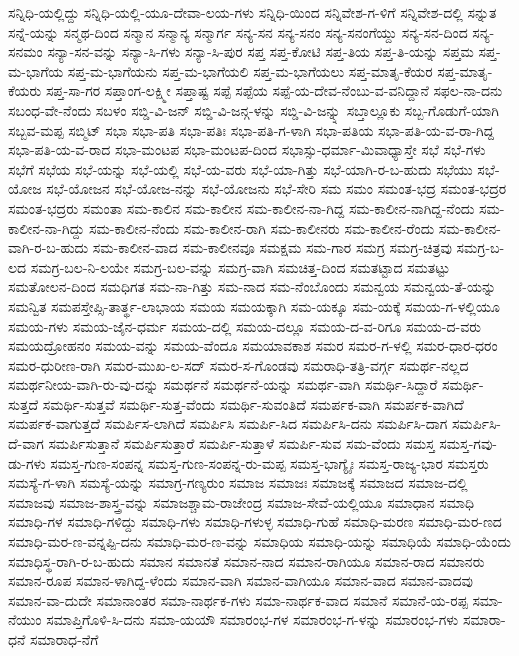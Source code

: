 ಸನ್ನಿಧಿ-ಯಲ್ಲಿದ್ದು
ಸನ್ನಿಧಿ-ಯಲ್ಲಿ-ಯೂ-ದೇವಾ-ಲಯ-ಗಳು
ಸನ್ನಿಧಿ-ಯಿಂದ
ಸನ್ನಿವೇಶ-ಗ-ಳಿಗೆ
ಸನ್ನಿವೇಶ-ದಲ್ಲಿ
ಸನ್ನುತ
ಸನ್ನೆ-ಯನ್ನು
ಸನ್ಮಥ-ದಿಂದ
ಸನ್ಮಾನ
ಸನ್ಮಾನ್ಯ
ಸನ್ಮಾರ್ಗ
ಸನ್ಯ-ಸನ
ಸನ್ಯ-ಸನಂ
ಸನ್ಯ-ಸನಂಗೆಯ್ದು
ಸನ್ಯ-ಸನ-ದಿಂದ
ಸನ್ಯ-ಸನಮಂ
ಸನ್ಯಾ-ಸನ-ವನ್ನು
ಸನ್ಯಾ-ಸಿ-ಗಳು
ಸನ್ಯಾ-ಸಿ-ಪುರ
ಸಪ್ತ
ಸಪ್ತ-ಕೋಟಿ
ಸಪ್ತ-ತಿಯ
ಸಪ್ತ-ತಿ-ಯನ್ನು
ಸಪ್ತಮ
ಸಪ್ತ-ಮ-ಭಾಗೆಯ
ಸಪ್ತ-ಮ-ಭಾಗೆಯನು
ಸಪ್ತ-ಮ-ಭಾಗೆಯಲಿ
ಸಪ್ತ-ಮ-ಭಾಗೆಯಲು
ಸಪ್ತ-ಮಾತೃ-ಕೆಯರ
ಸಪ್ತ-ಮಾತೃ-ಕೆಯರು
ಸಪ್ತ-ಸಾ-ಗರ
ಸಪ್ತಾಂಗ-ಲಕ್ಷ್ಮೀ
ಸಪ್ತಾಷ್ಟ
ಸಪ್ಪೆ
ಸಪ್ಪೆಯ
ಸಪ್ಪೆ-ಯ-ದೇವ-ನೆಂಬು-ವ-ವನಿದ್ದಾನೆ
ಸಫಲ-ನಾ-ದನು
ಸಬಂಧ-ವೇ-ನೆಂದು
ಸಬಳಂ
ಸಬ್ಡಿ-ವಿ-ಜನ್
ಸಬ್ಡಿ-ವಿ-ಜನ್ಗ-ಳನ್ನು
ಸಬ್ಡಿ-ವಿ-ಜನ್ನ್ನು
ಸಬ್ತಾಲ್ಲೂಕು
ಸಬ್ಬ-ಗೊಡುಗೆ-ಯಾಗಿ
ಸಬ್ಬವ-ಮಪ್ಪ
ಸಬ್ಮಿಟ್
ಸಭಾ
ಸಭಾ-ಪತಿ
ಸಭಾ-ಪತಿಃ
ಸಭಾ-ಪತಿ-ಗ-ಳಾಗಿ
ಸಭಾ-ಪತಿಯ
ಸಭಾ-ಪತಿ-ಯ-ವ-ರಾ-ಗಿದ್ದ
ಸಭಾ-ಪತಿ-ಯ-ವ-ರಾದ
ಸಭಾ-ಮಂಟಪ
ಸಭಾ-ಮಂಟಪ-ದಿಂದ
ಸಭಾಸ್ಸು-ಧರ್ಮಾ-ಮಿವಾಧ್ಯಾಸ್ತೇ
ಸಭೆ
ಸಭೆ-ಗಳು
ಸಭೆಗೆ
ಸಭೆಯ
ಸಭೆ-ಯನ್ನು
ಸಭೆ-ಯಲ್ಲಿ
ಸಭೆ-ಯ-ವರು
ಸಭೆ-ಯಾ-ಗಿತ್ತು
ಸಭೆ-ಯಾಗಿ-ರ-ಬ-ಹುದು
ಸಭೆಯು
ಸಭೆ-ಯೋಜ
ಸಭೆ-ಯೋಜನ
ಸಭೆ-ಯೋಜ-ನನ್ನು
ಸಭೆ-ಯೋಜನು
ಸಭೆ-ಸೇರಿ
ಸಮ
ಸಮಂ
ಸಮಂತ-ಭದ್ರ
ಸಮಂತ-ಭದ್ರರ
ಸಮಂತ-ಭದ್ರರು
ಸಮಂತಾ
ಸಮ-ಕಾಲಿನ
ಸಮ-ಕಾಲೀನ
ಸಮ-ಕಾಲೀನ-ನಾ-ಗಿದ್ದ
ಸಮ-ಕಾಲೀನ-ನಾಗಿದ್ದ-ನೆಂದು
ಸಮ-ಕಾಲೀನ-ನಾ-ಗಿದ್ದು
ಸಮ-ಕಾಲೀನ-ನೆಂದು
ಸಮ-ಕಾಲೀನ-ರಾಗಿ
ಸಮ-ಕಾಲೀನರು
ಸಮ-ಕಾಲೀನ-ರೆಂದು
ಸಮ-ಕಾಲೀನ-ವಾಗಿ-ರ-ಬ-ಹುದು
ಸಮ-ಕಾಲೀನ-ವಾದ
ಸಮ-ಕಾಲೀನವೂ
ಸಮಕ್ಷಮ
ಸಮ-ಗಾರ
ಸಮಗ್ರ
ಸಮಗ್ರ-ಚಿತ್ರವು
ಸಮಗ್ರ-ಬ-ಲದ
ಸಮಗ್ರ-ಬಲ-ನಿ-ಲಯೇ
ಸಮಗ್ರ-ಬಲ-ವನ್ನು
ಸಮಗ್ರ-ವಾಗಿ
ಸಮಚಿತ್ತ-ದಿಂದ
ಸಮತಟ್ಟಾದ
ಸಮತಟ್ಟು
ಸಮತೋಲನ-ದಿಂದ
ಸಮಧಿಗತ
ಸಮ-ನಾ-ಗಿತ್ತು
ಸಮ-ನಾದ
ಸಮ-ನೆಂಬೊಂದು
ಸಮನ್ವಯ
ಸಮನ್ವಯ-ತೆ-ಯನ್ನು
ಸಮನ್ವಿತ
ಸಮಪಸ್ತೇಪ್ಸಿ-ತಾರ್ತ್ಥ-ಲಾಭಾಯ
ಸಮಯ
ಸಮಯಕ್ಕಾಗಿ
ಸಮ-ಯಕ್ಕೂ
ಸಮ-ಯಕ್ಕೆ
ಸಮಯ-ಗ-ಳಲ್ಲಿಯೂ
ಸಮಯ-ಗಳು
ಸಮಯ-ಜೈನ-ಧರ್ಮ
ಸಮಯ-ದಲ್ಲಿ
ಸಮಯ-ದಲ್ಲೂ
ಸಮಯ-ದ-ವ-ರಿಗೂ
ಸಮಯ-ದ-ವರು
ಸಮಯದ್ರೋಹನಂ
ಸಮಯ-ವನ್ನು
ಸಮಯ-ವೆಂದೂ
ಸಮಯಾವಕಾಶ
ಸಮರ
ಸಮರ-ಗ-ಳಲ್ಲಿ
ಸಮರ-ಧಾರ-ಧರಂ
ಸಮರ-ಧುರೀಣ-ರಾಗಿ
ಸಮರ-ಮುಖ-ಲ-ಸದ್
ಸಮರ-ಸ-ಗೊಂಡವು
ಸಮರಾಧಿ-ತತ್ರಿ-ವರ್ಗ್ಗ
ಸಮರ್ಥ-ನಲ್ಲದ
ಸಮರ್ಥನೀಯ-ವಾಗಿ-ರು-ವು-ದನ್ನು
ಸಮರ್ಥನೆ
ಸಮರ್ಥನೆ-ಯನ್ನು
ಸಮರ್ಥ-ವಾಗಿ
ಸಮರ್ಥಿ-ಸಿದ್ದಾರೆ
ಸಮರ್ಥಿ-ಸುತ್ತದೆ
ಸಮರ್ಥಿ-ಸುತ್ತವೆ
ಸಮರ್ಥಿ-ಸುತ್ತ-ವೆಂದು
ಸಮರ್ಥಿ-ಸುವಂತಿದೆ
ಸಮರ್ಪಕ-ವಾಗಿ
ಸಮರ್ಪಕ-ವಾಗಿದೆ
ಸಮರ್ಪಕ-ವಾಗುತ್ತದೆ
ಸಮರ್ಪಿಸ-ಲಾಗಿದೆ
ಸಮರ್ಪಿಸಿ
ಸಮರ್ಪಿ-ಸಿದ
ಸಮರ್ಪಿಸಿ-ದನು
ಸಮರ್ಪಿಸಿ-ದಾಗ
ಸಮರ್ಪಿಸಿ-ದೆ-ವಾಗ
ಸಮರ್ಪಿಸುತ್ತಾನೆ
ಸಮರ್ಪಿಸುತ್ತಾರೆ
ಸಮರ್ಪಿ-ಸುತ್ತಾಳೆ
ಸಮರ್ಪಿ-ಸುವ
ಸಮ-ವೆಂದು
ಸಮಸ್ತ
ಸಮಸ್ತ-ಗವು-ಡು-ಗಳು
ಸಮಸ್ತ-ಗುಣ-ಸಂಪನ್ನ
ಸಮಸ್ತ-ಗುಣ-ಸಂಪನ್ನ-ರು-ಮಪ್ಪ
ಸಮಸ್ತ-ಭಾಗ್ಯೈಃ
ಸಮಸ್ತ-ರಾಜ್ಯ-ಭಾರ
ಸಮಸ್ತರು
ಸಮಸ್ಯೆ-ಗ-ಳಾಗಿ
ಸಮಸ್ಯೆ-ಯನ್ನು
ಸಮಾಗ್ರ-ಗಣ್ಯರುಂ
ಸಮಾಜ
ಸಮಾಜಃ
ಸಮಾಜಕ್ಕೆ
ಸಮಾಜದ
ಸಮಾಜ-ದಲ್ಲಿ
ಸಮಾಜವು
ಸಮಾಜ-ಶಾಸ್ತ್ರ-ವನ್ನು
ಸಮಾಜಶ್ಚಾಮ-ರಾಜೇಂದ್ರ
ಸಮಾಜ-ಸೇವೆ-ಯಲ್ಲಿಯೂ
ಸಮಾಧಾನ
ಸಮಾಧಿ
ಸಮಾಧಿ-ಗಳ
ಸಮಾಧಿ-ಗಳಿದ್ದು
ಸಮಾಧಿ-ಗಳು
ಸಮಾಧಿ-ಗಳುಳ್ಳ
ಸಮಾಧಿ-ಗುಹೆ
ಸಮಾಧಿ-ಮರಣ
ಸಮಾಧಿ-ಮರ-ಣದ
ಸಮಾಧಿ-ಮರ-ಣ-ವನ್ನಪ್ಪಿ-ದನು
ಸಮಾಧಿ-ಮರ-ಣ-ವನ್ನು
ಸಮಾಧಿಯ
ಸಮಾಧಿ-ಯನ್ನು
ಸಮಾಧಿಯೆ
ಸಮಾಧಿ-ಯೆಂದು
ಸಮಾಧಿಸ್ಥ-ರಾಗಿ-ರ-ಬ-ಹುದು
ಸಮಾನ
ಸಮಾನತೆ
ಸಮಾನ-ನಾದ
ಸಮಾನ-ರಾಗಿಯೂ
ಸಮಾನ-ರಾದ
ಸಮಾನರು
ಸಮಾನ-ರೂಪ
ಸಮಾನ-ಳಾಗಿದ್ದ-ಳೆಂದು
ಸಮಾನ-ವಾಗಿ
ಸಮಾನ-ವಾಗಿಯೂ
ಸಮಾನ-ವಾದ
ಸಮಾನ-ವಾದವು
ಸಮಾನ-ವಾ-ದುದೇ
ಸಮಾನಾಂತರ
ಸಮಾ-ನಾರ್ಥಕ-ಗಳು
ಸಮಾ-ನಾರ್ಥಕ-ವಾದ
ಸಮಾನೆ
ಸಮಾನೆ-ಯ-ರಪ್ಪ
ಸಮಾ-ನೆಯುಂ
ಸಮಾಪ್ತಿಗೊಳಿ-ಸಿ-ದನು
ಸಮಾ-ಯಯೌ
ಸಮಾರಂಭ-ಗಳ
ಸಮಾರಂಭ-ಗ-ಳನ್ನು
ಸಮಾರಂಭ-ಗಳು
ಸಮಾರಾ-ಧನೆ
ಸಮಾರಾಧ-ನೆಗೆ
